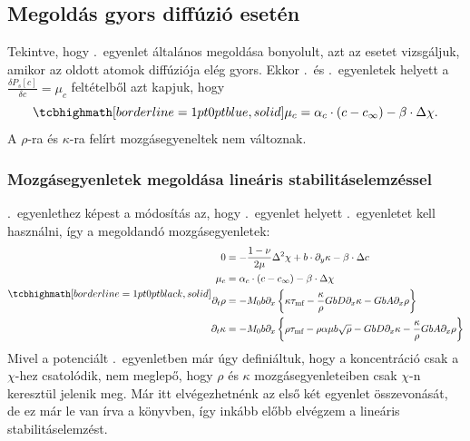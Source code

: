 \documentclass[10pt,a4paper]{scrartcl}
\begin{document}
\subsection{Megoldás gyors diffúzió esetén}
Tekintve, hogy .\ egyenlet általános megoldása bonyolult, azt az esetet vizsgáljuk, amikor az oldott atomok diffúziója elég gyors. Ekkor .\ és .\ egyenletek helyett a $\frac{{\delta {P_s}[c]}}{{\delta c}} = \mu_c$ feltételből azt kapjuk, hogy
\begin{equation} \label{eq:fd_c}
\tcbhighmath[borderline={1pt}{0pt}{blue,solid}]{
\mu_c = {\alpha _c} \cdot \left( {c - {c_\infty }} \right) - \beta  \cdot \Delta \chi.}
\end{equation}
A $\rho$-ra és $\kappa$-ra felírt mozgásegyeneltek nem változnak.
\subsubsection{Mozgásegyenletek megoldása lineáris stabilitáselemzéssel}
.\ egyenlethez képest a módosítás az, hogy .\ egyenlet helyett .\ egyenletet kell használni, így a megoldandó mozgásegyenletek:
\begin{gather}
\tcbhighmath[borderline={1pt}{0pt}{black,solid}]{
\begin{aligned}
0 & = - \frac{{1 - \nu }}{{2\mu }}{\Delta ^2}\chi  + b\cdot\partial_y\kappa - \beta  \cdot \Delta c \\
  \mu_c & = {\alpha _c} \cdot \left( {c - {c_\infty }} \right) - \beta  \cdot \Delta \chi \\ 
    {\partial _t}\rho  &  =  - {M_0}b{\partial _x}\left\{ {\kappa {\tau _{{\text{mf}}}} - \frac{\kappa }{\rho }GbD{\partial _x}\kappa  - GbA{\partial _x}\rho } \right\} \\ 
  {\partial _t}\kappa  &  =  - {M_0}b{\partial _x}\left\{ {\rho {\tau _{{\text{mf}}}} - \rho \alpha \mu b\sqrt \rho - GbD{\partial _x}\kappa  - \frac{\kappa }{\rho } GbA{\partial _x}\rho } \right\}
\end{aligned}  }
\end{gather}
Mivel a potenciált .\ egyenletben már úgy definiáltuk, hogy a koncentráció csak a $\chi$-hez csatolódik, nem meglepő, hogy $\rho$ és $\kappa$ mozgásegyenleteiben csak $\chi$-n keresztül jelenik meg. Már itt elvégezhetnénk az első két egyenlet összevonását, de ez már le van írva a könyvben, így inkább előbb elvégzem a lineáris stabilitáselemzést.
\end{document}
